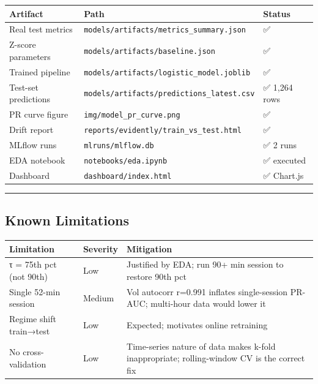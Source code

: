 \documentclass[
]{article}
\begin{document}
\begin{longtable}[]{@{}lll@{}}
\toprule
Artifact & Path & Status \\
\midrule
\endhead
Real test metrics & \texttt{models/artifacts/metrics\_summary.json} &
✅ \\
Z-score parameters & \texttt{models/artifacts/baseline.json} & ✅ \\
Trained pipeline & \texttt{models/artifacts/logistic\_model.joblib} &
✅ \\
Test-set predictions & \texttt{models/artifacts/predictions\_latest.csv}
& ✅ 1,264 rows \\
PR curve figure & \texttt{img/model\_pr\_curve.png} & ✅ \\
Drift report & \texttt{reports/evidently/train\_vs\_test.html} & ✅ \\
MLflow runs & \texttt{mlruns/mlflow.db} & ✅ 2 runs \\
EDA notebook & \texttt{notebooks/eda.ipynb} & ✅ executed \\
Dashboard & \texttt{dashboard/index.html} & ✅ Chart.js \\
\bottomrule
\end{longtable}

\begin{center}\rule{0.5\linewidth}{0.5pt}\end{center}

\hypertarget{known-limitations}{%
\subsection{Known Limitations}\label{known-limitations}}

\begin{longtable}[]{@{}
  >{\raggedright\arraybackslash}p{}
  >{\raggedright\arraybackslash}p{}
  >{\raggedright\arraybackslash}p{}@{}}
\toprule
Limitation & Severity & Mitigation \\
\midrule
\endhead
τ = 75th pct (not 90th) & Low & Justified by EDA; run 90+ min session to
restore 90th pct \\
Single 52-min session & Medium & Vol autocorr r=0.991 inflates
single-session PR-AUC; multi-hour data would lower it \\
Regime shift train→test & Low & Expected; motivates online retraining \\
No cross-validation & Low & Time-series nature of data makes k-fold
inappropriate; rolling-window CV is the correct fix \\
\bottomrule
\end{longtable}
\end{document}
